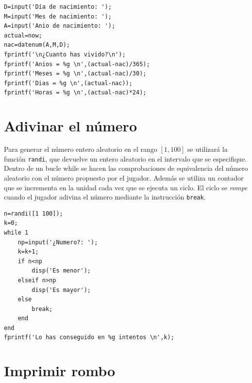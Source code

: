 \sol

\begin{verbatim}
D=input('Día de nacimiento: ');
M=input('Mes de nacimiento: ');
A=input('Anio de nacimiento: ');
actual=now;
nac=datenum(A,M,D);
fprintf('\n¿Cuanto has vivido?\n');
fprintf('Anios = %g \n',(actual-nac)/365);
fprintf('Meses = %g \n',(actual-nac)/30);
fprintf('Dias = %g \n',(actual-nac));
fprintf('Horas = %g \n',(actual-nac)*24);
\end{verbatim}


\section{Adivinar el número}


\sol

Para generar el número entero aleatorio en el rango $[1,100]$ se utilizará la función \texttt{randi}, que devuelve un 
entero aleatorio en el intervalo que se especifique. Dentro de un bucle while se hacen las comprobaciones de equivalencia 
del número aleatorio con el número propuesto por el jugador. Además se utiliza un contador que se incrementa en la unidad 
cada vez que se ejecuta un ciclo. El ciclo se \textit{rompe} cuando el jugador adivina el número mediante la 
instrucción \texttt{break}.

\begin{verbatim}
n=randi([1 100]);
k=0;
while 1
    np=input('¿Numero?: ');
    k=k+1;
    if n<np
        disp('Es menor');
    elseif n>np
        disp('Es mayor');
    else
        break;
    end
end
fprintf('Lo has conseguido en %g intentos \n',k);
\end{verbatim}

\section{Imprimir rombo} 

